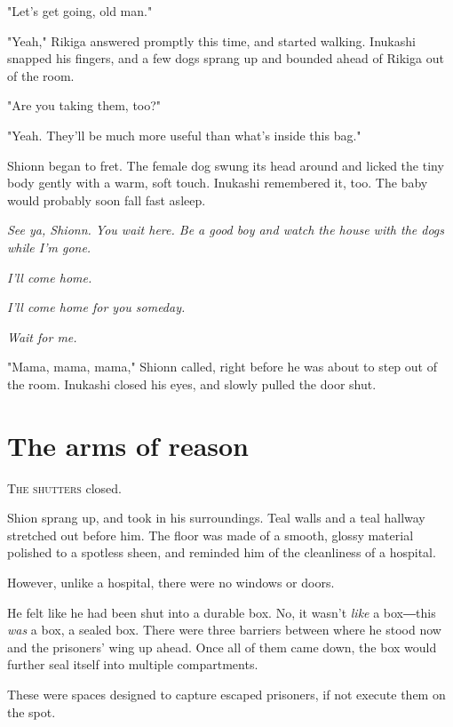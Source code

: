 "Let's get going, old man."

"Yeah," Rikiga answered promptly this time, and started walking.
Inukashi snapped his fingers, and a few dogs sprang up and bounded ahead
of Rikiga out of the room.

"Are you taking them, too?"

"Yeah. They'll be much more useful than what's inside this bag."

Shionn began to fret. The female dog swung its head around and licked
the tiny body gently with a warm, soft touch. Inukashi remembered it,
too. The baby would probably soon fall fast asleep.

\emph{See ya, Shionn. You wait here. Be a good boy and watch the house with
	the dogs while I'm gone.}

\emph{I'll come home.}

\emph{I'll come home for you someday.}

\emph{Wait for me.}

"Mama, mama, mama," Shionn called, right before he was about to step out
of the room. Inukashi closed his eyes, and slowly pulled the door shut.

\chapter{The arms of reason}


\lettrine{T}{he shutters} closed.

Shion sprang up, and took in his surroundings. Teal walls and a teal
hallway stretched out before him. The floor was made of a smooth, glossy
material polished to a spotless sheen, and reminded him of the
cleanliness of a hospital.

However, unlike a hospital, there were no windows or doors.

He felt like he had been shut into a durable box. No, it wasn't \emph{like} a
box―this \emph{was} a box, a sealed box. There were three barriers between
where he stood now and the prisoners' wing up ahead. Once all of them
came down, the box would further seal itself into multiple compartments.

These were spaces designed to capture escaped prisoners, if not execute
them on the spot.

